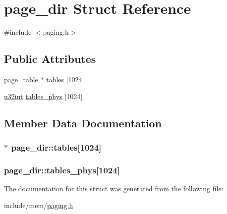 \hypertarget{structpage__dir}{}\section{page\+\_\+dir Struct Reference}
\label{structpage__dir}


{\ttfamily \#include $<$paging.\+h$>$}

\subsection*{Public Attributes}
\begin{DoxyCompactItemize}
\item 
\hyperlink{structpage__table}{page\+\_\+table} $\ast$ \hyperlink{structpage__dir_ac89434e3fccabfe9481ea77fdda82faf}{tables} \mbox{[}1024\mbox{]}
\item 
\hyperlink{system_8h_a757de76cafbcddaac0d1632902fe4cb8}{u32int} \hyperlink{structpage__dir_a7336b695acaf516613dda626129129d0}{tables\+\_\+phys} \mbox{[}1024\mbox{]}
\end{DoxyCompactItemize}


\subsection{Member Data Documentation}
\hypertarget{structpage__dir_ac89434e3fccabfe9481ea77fdda82faf}{}
\subsubsection[{tables}]{$\ast$ page\+\_\+dir\+::tables\mbox{[}1024\mbox{]}}\label{structpage__dir_ac89434e3fccabfe9481ea77fdda82faf}
\hypertarget{structpage__dir_a7336b695acaf516613dda626129129d0}{}
\subsubsection[{tables\+\_\+phys}]{ page\+\_\+dir\+::tables\+\_\+phys\mbox{[}1024\mbox{]}}\label{structpage__dir_a7336b695acaf516613dda626129129d0}


The documentation for this struct was generated from the following file\+:\begin{DoxyCompactItemize}
\item 
include/mem/\hyperlink{paging_8h}{paging.\+h}\end{DoxyCompactItemize}
